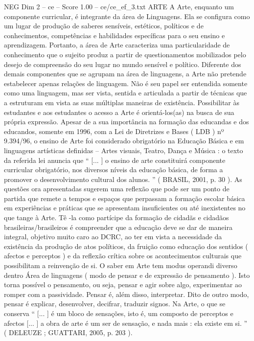 \begin{textsample}{NEG Dim 2 – ce – Score 1.00 – ce/ce\_ef\_3.txt}  \label{ex:f2_neg_205}
ARTE A Arte, enquanto um componente curricular, é integrante da área de Linguagens.
Ela se configura como um lugar de produção de saberes sensíveis, estéticos, políticos e de conhecimentos, competências e habilidades específicas para o seu ensino e aprendizagem.
Portanto, a área de Arte caracteriza uma particularidade de conhecimento que o sujeito produz a partir de questionamentos mobilizados pelo desejo de compreensão do seu lugar no mundo sensível e político.
Diferente dos demais componentes que se agrupam na área de linguagens, a Arte não pretende estabelecer apenas relações de linguagem.
Não é seu papel ser entendida somente como uma linguagem, mas ser vista, sentida e articulada a partir de técnicas que a estruturam em vista as suas múltiplas maneiras de existência.
Possibilitar às estudantes e aos estudantes o acesso a Arte é orientá-los(as) na busca de sua própria expressão.
Apesar de a sua importância na formação das educandas e dos educandos, somente em 1996, com a Lei de Diretrizes e Bases ( LDB ) nº 9.394/96, o ensino de Arte foi considerado obrigatório na Educação Básica e em linguagens artísticas definidas – Artes visuais, Teatro, Dança e Música : o texto da referida lei anuncia que “ [... ] o ensino de arte constituirá componente curricular obrigatório, nos diversos níveis da educação básica, de forma a promover o desenvolvimento cultural dos alunos. ” ( BRASIL, 2001, p. 30 ).
As questões ora apresentadas sugerem uma reflexão que pode ser um ponto de partida que remete a tempos e espaços que perpassam a formação escolar básica em experiências e práticas que se apresentam insuficientes ou até inexistentes no que tange à Arte.
Tê -la como partícipe da formação de cidadãs e cidadãos brasileiras/brasileiros é compreender que a educação deve se dar de maneira integral, objetivo muito caro ao DCRC, ao ter em vista a necessidade da existência da produção de atos políticos, da fruição como educação dos sentidos ( afectos e perceptos ) e da reflexão crítica sobre os acontecimentos culturais que possibilitam a reinvenção de si.
O saber em Arte tem modus operandi diverso dentro Área de linguagens ( modo de pensar e de expressão de pensamento ).
Isto torna possível o pensamento, ou seja, pensar e agir sobre algo, experimentar ao romper com a passividade.
Pensar é, além disso, interpretar.
Dito de outro modo, pensar é explicar, desenvolver, decifrar, traduzir signos.
Na Arte, o que se conserva “ [... ] é um bloco de sensações, isto é, um composto de perceptos e afectos [... ] a obra de arte é um ser de sensação, e nada mais : ela existe em si. ” ( DELEUZE ; GUATTARI, 2005, p. 203 ).

\end{textsample}
